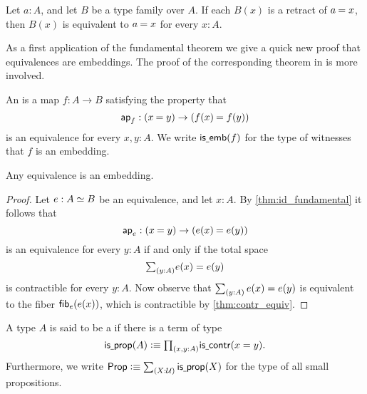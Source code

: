\begin{cor}\label{cor:id_fundamental_retr}
Let $a:A$, and let $B$ be a type family over $A$. If each $B(x)$ is a retract of $\id{a}{x}$, then $B(x)$ is equivalent to $\id{a}{x}$ for every $x:A$.
\end{cor}

As a first application of the fundamental theorem we give a quick new proof that equivalences are embeddings. The proof of the corresponding theorem in \cite{hottbook} is more involved.

\begin{defn}
An  is a map $f:A\to B$ satisfying the property that
\begin{equation*}
\apfunc{f}:(\id{x}{y})\to(\id{f(x)}{f(y)})
\end{equation*}
is an equivalence for every $x,y:A$. We write $\mathsf{is\underline{\ }{}emb}(f)$ for the type of witnesses that $f$ is an embedding.
\end{defn}

\begin{prp}
\label{cor:emb_equiv} 
Any equivalence is an embedding.
\end{prp}

\begin{proof}
Let $e:\eqv{A}{B}$ be an equivalence, and let $x:A$. By \autoref{thm:id_fundamental} it follows that
\begin{equation*}
\apfunc{e} : (\id{x}{y})\to (\id{e(x)}{e(y)})
\end{equation*}
is an equivalence for every $y:A$ if and only if the total space
\begin{equation*}
\sm{y:A}e(x)=e(y)
\end{equation*}
is contractible for every $y:A$. Now observe that $\sm{y:A}e(x)=e(y)$ is equivalent to the fiber $\mathsf{fib}_{e}(e(x))$, which is contractible by \cref{thm:contr_equiv}.
\end{proof}

\begin{defn}
A type $A$ is said to be a  if there is a term of type
\begin{equation*}
\isprop(A)\defeq\prd{x,y:A}\iscontr(x=y).
\end{equation*}
Furthermore, we write $\prop\defeq\sm{X:\UU}\isprop(X)$ for the type of all small propositions.
\end{defn}

